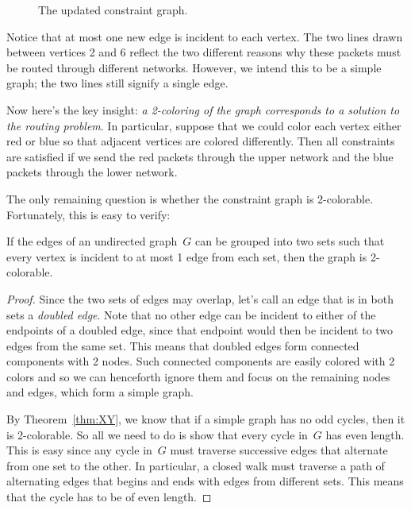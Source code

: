 \begin{figure}


\caption{The updated constraint graph.}

\label{fig:6EW}

\end{figure}

Notice that at most one new edge is incident to each vertex.
The two lines drawn between vertices 2 and 6 reflect the two different
reasons why these packets must be routed through different networks.
However, we intend this to be a simple graph; the two lines still
signify a single edge.

Now here's the key insight: \emph{a 2-coloring of the graph
corresponds to a solution to the routing problem}.  In particular,
suppose that we could color each vertex either red or blue so that
adjacent vertices are colored differently.  Then all constraints are
satisfied if we send the red packets through the upper network and the
blue packets through the lower network.

The only remaining question is whether the constraint graph is
2-colorable.  Fortunately, this is easy to verify:

\begin{lemma}\label{deg1-union}
  If the edges of an undirected graph~$G$ can be grouped into two sets
  such that every vertex is incident to at most 1 edge from each set,
  then the graph is 2-colorable.
\end{lemma}

\begin{proof}
Since the two sets of edges may overlap, let's call an edge that is in
both sets a \emph{doubled edge}.  Note that no other edge can be
incident to either of the endpoints of a doubled edge, since that
endpoint would then be incident to two edges from the same set.  This
means that doubled edges form connected components with 2 nodes.  Such
connected components are easily colored with 2 colors and so we can
henceforth ignore them and focus on the remaining nodes and edges,
which form a simple graph.

By Theorem~\ref{thm:XY}, we know that if a simple graph has no odd
cycles, then it is 2-colorable.  So all we need to do is show that
every cycle in~$G$ has even length.  This is easy since any cycle
in~$G$ must traverse successive edges that alternate from one set to
the other.  In particular, a closed walk must traverse a path of
alternating edges that begins and ends with edges from different sets.
This means that the cycle has to be of even length.
\end{proof}

